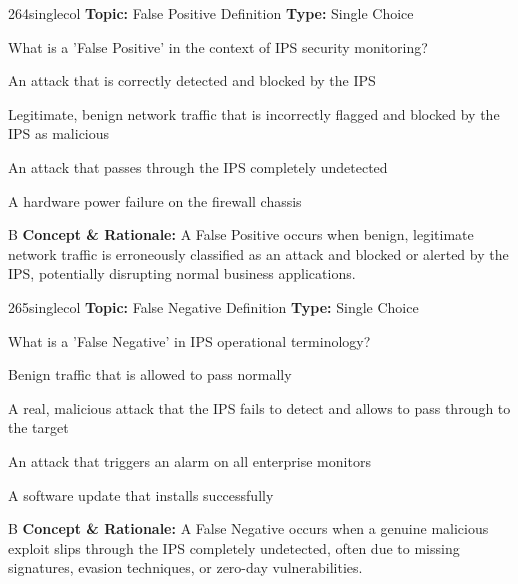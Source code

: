 \begin{qcard}{264}{singlecol}
\textcolor{darkslate!75}{\small\textbf{Topic:} False Positive Definition \hfill \textbf{Type:} Single Choice}\vspace{0.4em}\par
What is a 'False Positive' in the context of IPS security monitoring?
\begin{qoptions}
\item An attack that is correctly detected and blocked by the IPS
\item Legitimate, benign network traffic that is incorrectly flagged and blocked by the IPS as malicious
\item An attack that passes through the IPS completely undetected
\item A hardware power failure on the firewall chassis
\end{qoptions}
\end{qcard}
\nopagebreak
\begin{explainbox}{B}
\textbf{Concept \& Rationale:} A False Positive occurs when benign, legitimate network traffic is erroneously classified as an attack and blocked or alerted by the IPS, potentially disrupting normal business applications.
\end{explainbox}

\begin{qcard}{265}{singlecol}
\textcolor{darkslate!75}{\small\textbf{Topic:} False Negative Definition \hfill \textbf{Type:} Single Choice}\vspace{0.4em}\par
What is a 'False Negative' in IPS operational terminology?
\begin{qoptions}
\item Benign traffic that is allowed to pass normally
\item A real, malicious attack that the IPS fails to detect and allows to pass through to the target
\item An attack that triggers an alarm on all enterprise monitors
\item A software update that installs successfully
\end{qoptions}
\end{qcard}
\nopagebreak
\begin{explainbox}{B}
\textbf{Concept \& Rationale:} A False Negative occurs when a genuine malicious exploit slips through the IPS completely undetected, often due to missing signatures, evasion techniques, or zero-day vulnerabilities.
\end{explainbox}

